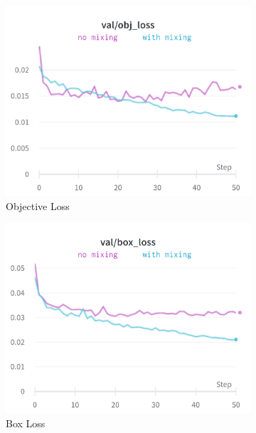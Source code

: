 \begin{figure}[!h]
\centering
\begin{subfigure}{0.33\textwidth}
  \centering
  \includegraphics[width=\linewidth]{images/implementation/windowing/mixing/mixing_obj_loss}
  \caption{Objective Loss}
\end{subfigure}%
\begin{subfigure}{0.33\textwidth}
  \centering
  \includegraphics[width=\linewidth]{images/implementation/windowing/mixing/mixing_box_loss}
  \caption{Box Loss}
\end{subfigure}%
\begin{subfigure}{0.33\textwidth}
  \centering

\end{subfigure}
\end{figure}
